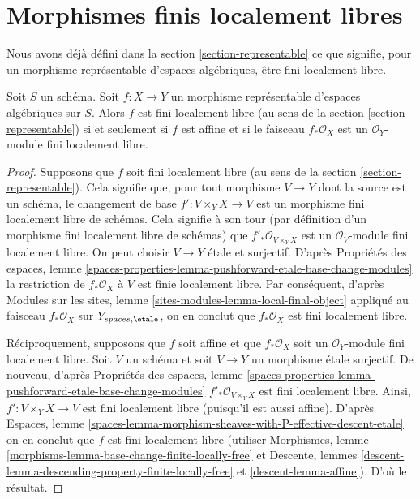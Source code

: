 \section{Morphismes finis localement libres}
\label{section-finite-locally-free}

\noindent
Nous avons déjà défini dans la section \ref{section-representable}
ce que signifie, pour un morphisme représentable d'espaces algébriques,
être fini localement libre.

\begin{lemma}
\label{lemma-finite-locally-free-representable}
Soit $S$ un schéma. Soit $f : X \to Y$ un morphisme représentable
d'espaces algébriques sur $S$. Alors $f$ est fini localement libre
(au sens de la section \ref{section-representable})
si et seulement si $f$ est affine et si le faisceau $f_*\mathcal{O}_X$ est
un $\mathcal{O}_Y$-module fini localement libre.
\end{lemma}

\begin{proof}
Supposons que $f$ soit fini localement libre (au sens de la
section \ref{section-representable}). Cela signifie que,
pour tout morphisme $V \to Y$ dont la source est un schéma, le
changement de base $f' : V \times_Y X \to V$ est un morphisme fini localement libre
de schémas. Cela signifie à son tour (par définition d'un morphisme fini
localement libre de schémas) que
$f'_*\mathcal{O}_{V \times_Y X}$
est un $\mathcal{O}_V$-module fini localement libre. On peut choisir $V \to Y$
étale et surjectif. D'après
Propriétés des espaces,
lemme \ref{spaces-properties-lemma-pushforward-etale-base-change-modules}
la restriction de $f_*\mathcal{O}_X$ à $V$ est
finie localement libre. Par conséquent, d'après
Modules sur les sites, lemme \ref{sites-modules-lemma-local-final-object}
appliqué au faisceau $f_*\mathcal{O}_X$ sur $Y_{spaces, \etale}$,
on en conclut que $f_*\mathcal{O}_X$ est fini localement libre.

\medskip\noindent
Réciproquement, supposons que $f$ soit affine et que $f_*\mathcal{O}_X$ soit un
$\mathcal{O}_Y$-module fini localement libre. Soit $V$ un schéma et soit
$V \to Y$ un morphisme étale surjectif. De nouveau, d'après
Propriétés des espaces,
lemme \ref{spaces-properties-lemma-pushforward-etale-base-change-modules}
$f'_*\mathcal{O}_{V \times_Y X}$ est fini localement libre.
Ainsi, $f' : V \times_Y X \to V$ est fini localement libre (puisqu'il est aussi affine).
D'après
Espaces,
lemme \ref{spaces-lemma-morphism-sheaves-with-P-effective-descent-etale}
on en conclut que $f$ est fini localement libre (utiliser
Morphismes, lemme \ref{morphisms-lemma-base-change-finite-locally-free}
et Descente, lemmes \ref{descent-lemma-descending-property-finite-locally-free}
et \ref{descent-lemma-affine}). D'où le résultat.
\end{proof}

